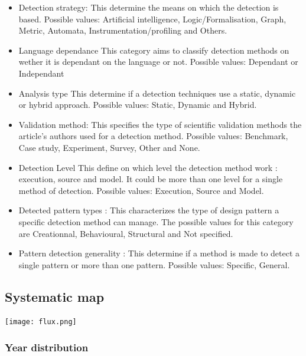 \documentclass[letterpaper, 10 pt, conference]{ieeeconf}  %
\begin{document}
\begin{itemize}
  \item Detection strategy:
    This determine the means on which the detection is based.
    Possible values: Artificial intelligence, Logic/Formalisation, Graph,
    Metric, Automata, Instrumentation/profiling and Others.

  \item Language dependance
    This category aims to classify detection methods on wether it is dependant
    on the language or not. 
    Possible values: Dependant or Independant

  \item Analysis type
    This determine if a detection techniques use a static, dynamic or hybrid
    approach.
    Possible values: Static, Dynamic and Hybrid.

  \item Validation method:
    This specifies the type of scientific validation methods the article's 
    authors used for a detection method.
    Possible values: Benchmark, Case study, Experiment, Survey, Other and
    None.
    
  \item{Detection Level}
    This define on which level the detection method work : execution, source
    and model.
    It could be more than one level for a single method of detection.
    Possible values: Execution, Source and Model.

  \item Detected pattern types :
    This characterizes the type of design pattern a specific detection method
    can manage.
    The possible values for this category are Creationnal, Behavioural,
    Structural and Not specified.

  \item Pattern detection generality :
    This determine if a method is made to detect a single pattern or more than
    one pattern.
    Possible values: Specific, General.
\end{itemize}

\subsection{Systematic map}

\begin{center}
\texttt{[image: flux.png]}
\end{center}

\subsubsection{Year distribution}
\end{document}
